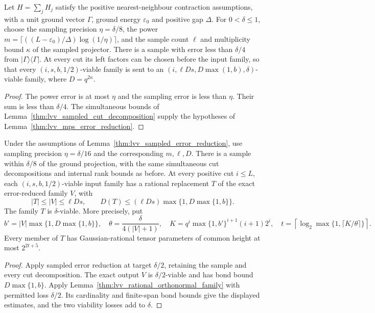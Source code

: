 \begin{lemma}
    \label{thm:lvv_sampled_error_reduction}
    \leanok
    Let $H=\sum_jH_j$ satisfy the positive nearest-neighbour contraction
    assumptions, with a unit ground vector $\Gamma$, ground energy
    $\varepsilon_0$ and positive gap $\Delta$. For $0<\delta\le1$, choose
    the sampling precision $\eta=\delta/8$, the power
    $m=\lceil((L-\varepsilon_0)/\Delta)\log(1/\eta)\rceil$, and the sample
    count $\ell$ and multiplicity bound $\kappa$ of the sampled projector.
    There is a sample with error less than $\delta/4$ from
    $|\Gamma\rangle\langle\Gamma|$. At every cut its left factors can be
    chosen before the input family, so that every $(i,s,b,1/2)$-viable
    family is sent to an $(i,\ell Ds,D\max(1,b),\delta)$-viable family,
    where $D=q^{2\kappa}$.
\end{lemma}
\begin{proof}
    \leanok
    The power error is at most $\eta$ and the sampling error is less than
    $\eta$. Their sum is less than $\delta/4$. The simultaneous bounds of
    Lemma~\ref{thm:lvv_sampled_cut_decomposition} supply the hypotheses
    of Lemma~\ref{thm:lvv_mps_error_reduction}.
\end{proof}

\begin{lemma}
    \label{thm:lvv_rational_sampled_error_reduction}
    \leanok
    Under the assumptions of Lemma~\ref{thm:lvv_sampled_error_reduction},
    use sampling precision $\eta=\delta/16$ and the corresponding
    $m,\ell,D$. There is a sample within $\delta/8$ of the ground
    projection, with the same simultaneous cut decompositions and internal
    rank bounds as before. At every positive cut $i\le L$, each
    $(i,s,b,1/2)$-viable input family has a rational replacement $T$ of
    the exact error-reduced family $V$, with
    \[
        |T|\le |V|\le\ell Ds,\qquad
        D(T)\le(\ell Ds)\max\{1,D\max\{1,b\}\}.
    \]
    The family $T$ is $\delta$-viable. More precisely, put
    \[
        b'=|V|\max\{1,D\max\{1,b\}\},\quad
        \theta=\frac{\delta}{4(|V|+1)},\quad
        K=q^i\max\{1,b'\}^{i+1}(i+1)2^i,\quad
        t=\left\lceil\log_2\max\{1,\lceil K/\theta\rceil\}\right\rceil.
    \]
    Every member of $T$ has Gaussian-rational tensor parameters of
    common height at most $2^{2t+5}$.
\end{lemma}
\begin{proof}\leanok
    Apply sampled error reduction at target $\delta/2$, retaining the
    sample and every cut decomposition. The exact output $V$ is
    $\delta/2$-viable and has bond bound $D\max\{1,b\}$.
    Apply Lemma~\ref{thm:lvv_rational_orthonormal_family} with
    permitted loss $\delta/2$. Its cardinality and finite-span bond bounds
    give the displayed estimates, and the two viability losses add to
    $\delta$.
\end{proof}


